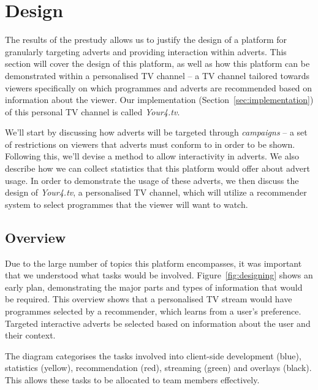 \section{Design}

The results of the prestudy allows us to justify the design of a platform for granularly targeting adverts and providing interaction within adverts. This section will cover the design of this platform, as well as how this platform can be demonstrated within a personalised TV channel -- a TV channel tailored towards viewers specifically on which programmes and adverts are recommended based on information about the viewer. Our implementation (Section~\ref{sec:implementation}) of this personal TV channel is called \textit{Your4.tv}.

We'll start by discussing how adverts will be targeted through \textit{campaigns} -- a set of restrictions on viewers that adverts must conform to in order to be shown. Following this, we'll devise a method to allow interactivity in adverts. We also describe how we can collect statistics that this platform would offer about advert usage. In order to demonstrate the usage of these adverts, we then discuss the design of \textit{Your4.tv}, a personalised TV channel, which will utilize a recommender system to select programmes that the viewer will want to watch.

\subsection{Overview}

	Due to the large number of topics this platform encompasses, it was important that we understood what tasks would be involved. Figure~\ref{fig:designing} shows an early plan, demonstrating the major parts and types of information that would be required. This overview shows that a personalised TV stream would have programmes selected by a recommender, which learns from a user's preference. Targeted interactive adverts be selected based on information about the user and their context.

	The diagram categorises the tasks involved into client-side development (blue), statistics (yellow), recommendation (red), streaming (green) and overlays (black). This allows these tasks to be allocated to team members effectively.

